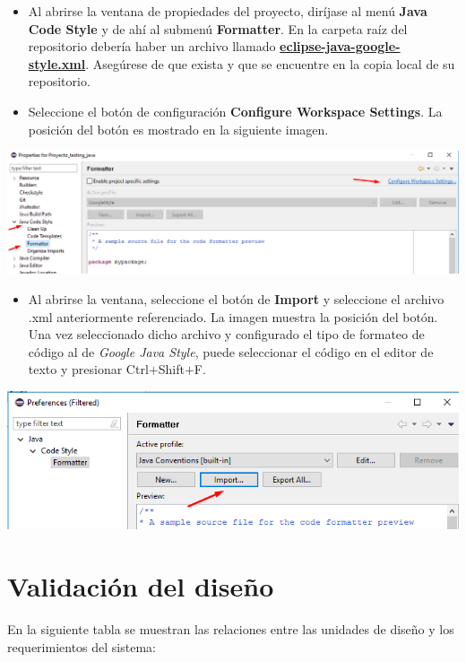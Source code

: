 \documentclass[a4paper]{article}
\newcommand\tab[1][0.55cm]{\hspace*{#1}}
\begin{document}
{\begin{itemize}
\item Al abrirse la ventana de propiedades del proyecto, diríjase al menú \textbf{Java Code Style} y de ahí al submenú \textbf{Formatter}. En la carpeta raíz del repositorio debería haber un archivo llamado \textbf{\url{eclipse-java-google-style.xml}}. Asegúrese de que exista y que se encuentre en la copia local de su repositorio. 
\item Seleccione el botón de configuración \textbf{Configure Workspace Settings}. La posición del botón es mostrado en la siguiente imagen.
\end{itemize} 
\centering
\includegraphics[scale=0.5]{Screenshot_CheckStyle_7.png}
\justify
\begin{itemize}
\item Al abrirse la ventana, seleccione el botón de \textbf{Import} y seleccione el archivo .xml anteriormente referenciado. La imagen muestra la posición del botón. Una vez seleccionado dicho archivo y configurado el tipo de formateo de código al de \textit{Google Java Style}, puede seleccionar el código en el editor de texto y presionar Ctrl$+$Shift$+$F.
\end{itemize} 
\centering
\includegraphics[scale=0.5]{Screenshot_CheckStyle_9.png}
\justify


\justify 
\newpage
\color{Blue}
\centering{ \rule{16cm}{0.1cm} } 
\justify 
\color{Blue}
\section{Validación del diseño}
\color{black}
\justify 

\tab En la siguiente tabla se muestran las relaciones entre las unidades de diseño y los requerimientos del sistema:\\
    
}
\end{document}
